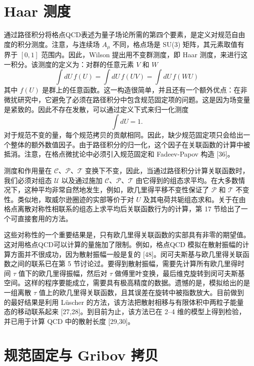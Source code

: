 \section{Haar 测度}

通过路径积分将格点QCD表述为量子场论所需的第四个要素，是定义对规范自由度的积分测度。注意，与连续场 $A_\mu$ 不同，格点场是 SU(3) 矩阵，其元素取值有界于 $[0,1]$ 范围内。因此，Wilson 提出用不变群测度，即 Haar 测度，来进行这一积分。该测度的定义为：对群的任意元素 $V$ 和 $W$
\begin{equation}
\label{eq:haarmeasure}
\int dU\, f(U) = \int dU\, f(UV) = \int dU\, f(WU)
\end{equation}
其中 $f(U)$ 是群上的任意函数。这一构造很简单，并且还有一个额外优点：在非微扰研究中，它避免了必须在路径积分中包含规范固定项的问题。这是因为场变量是紧致的。因此不存在发散，可以通过定义下式来归一化测度
\begin{equation}
\label{eq:haarnorm}
\int dU = 1 .
\end{equation}
对于规范不变的量，每个规范拷贝的贡献相同。因此，缺少规范固定项只会给出一个整体的额外数值因子。由于路径积分的归一化，这个因子在关联函数的计算中被抵消。注意，在格点微扰论中必须引入规范固定和 Fadeev-Papov 构造 [36]。

测度和作用量在 $\mathcal{C}$、$\mathcal{P}$、$\mathcal{T}$ 变换下不变，因此，当通过路径积分计算关联函数时，我们必须对组态 $\mathcal{U}$ 以及通过施加 $\mathcal{C}$、$\mathcal{P}$、$\mathcal{T}$ 由它得到的组态求平均。在大多数情况下，这种平均非常自然地发生，例如，欧几里得平移不变性保证了 $\mathcal{P}$ 和 $\mathcal{T}$ 不变性。类似地，取威尔逊圈迹的实部等价于对 $U$ 及其电荷共轭组态求和。关于在由格点离散对称性相联系的组态上求平均后关联函数行为的计算，第 17 节给出了一个可直接套用的方法。

这些对称性的一个重要结果是，只有欧几里得关联函数的实部具有非零的期望值。这对用格点QCD可以计算的量施加了限制。例如，格点QCD 模拟在散射振幅的计算方面并不很成功，因为散射振幅一般是复的 [48]。闵可夫斯基与欧几里得关联函数之间的联系已在第 5 节讨论过。要得到散射振幅，需要先计算所有欧几里得时间 $\tau$ 值下的欧几里得振幅，然后对 $\tau$ 做傅里叶变换，最后维克旋转到闵可夫斯基空间。这样的程序要能成立，需要具有极高精度的数据。遗憾的是，模拟给出的是一组离散 $\tau$ 值上的欧几里得关联函数，且其误差在旋转中被指数放大。目前做到的最好结果是利用 L\"uscher 的方法，该方法把散射相移与有限体积中两粒子能量态的移动联系起来 [27,28]。到目前为止，该方法已在 2--4 维的模型上得到检验，并已用于计算 QCD 中的散射长度 [29,30]。

\section{规范固定与 Gribov 拷贝}


